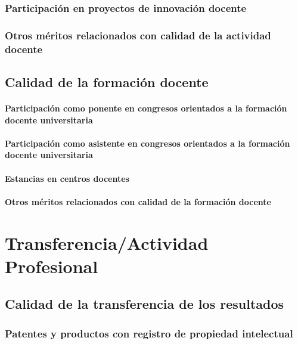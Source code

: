 \documentclass[a4paper, 11pt, twoside, openright]{report}
\begin{document}
\subsection{Participación en proyectos de innovación docente}

\subsection{Otros méritos relacionados con calidad de la actividad docente}

\section{Calidad de la formación docente}

\subsubsection{Participación como ponente en congresos orientados a la formación docente universitaria}

\subsubsection{Participación como asistente en congresos orientados a la formación docente universitaria}

\subsubsection{Estancias en centros docentes}

\subsubsection{Otros méritos relacionados con calidad de la formación docente}


\chapter{Transferencia/Actividad Profesional}

\section{Calidad de la transferencia de los resultados}

\subsection{Patentes y productos con registro de propiedad intelectual}
\end{document}
